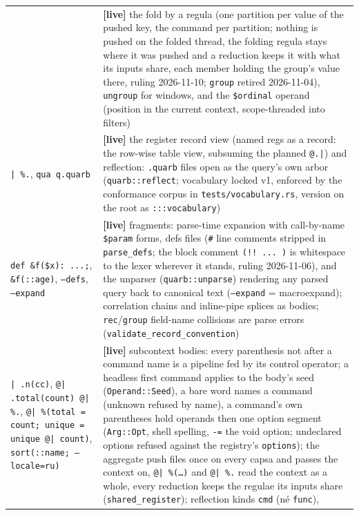 \documentclass{report}
\newcommand{\live}{\textbf{\textcolor{blue!60!black}{[live]}}\xspace}
\begin{document}
\begin{xltabular}{\textwidth}{>{\raggedright\arraybackslash}p{0.36\textwidth} X}
  & \live the fold by a regula (one partition per value of the
    pushed key, the command per partition; nothing is pushed on the
    folded thread, the folding regula stays where it was pushed and
    a reduction keeps it with what its inputs share, each member
    holding the group's value there, ruling 2026-11-10;
    \texttt{group} retired 2026-11-04),
    \texttt{ungroup} for windows, and the \texttt{\$ordinal} operand
    (position in the current context, scope-threaded into filters) \\
\texttt{| \%.}, \texttt{qua q.quarb}
  & \live the register record view (named regs as a record: the
    row-wise table view, subsuming the planned \texttt{@.|}) and
    reflection: \texttt{.quarb} files open as the query's own arbor
    (\texttt{quarb::reflect}; vocabulary locked v1, enforced by the
    conformance corpus in \texttt{tests/vocabulary.rs}, version on
    the root as \texttt{:::vocabulary}) \\
\texttt{def \&f(\$x): ...;}, \texttt{\&f(::age)},
\texttt{--defs}, \texttt{--expand}
  & \live fragments: parse-time expansion with call-by-name
    \texttt{\$param} forms, defs files (\texttt{\#} line comments
    stripped in \texttt{parse\_defs}; the block comment
    \texttt{(!!\ ...\ )} is whitespace to the lexer wherever it
    stands, ruling 2026-11-06), and the unparser
    (\texttt{quarb::unparse}) rendering any parsed query back to
    canonical text (\texttt{--expand} = macroexpand); correlation
    chains and inline-pipe splices as bodies;
    \texttt{rec}/\texttt{group} field-name collisions are parse
    errors (\texttt{validate\_record\_convention}) \\
\texttt{| .n(cc)}, \texttt{@| .total(count) @| \%.},
\texttt{@| \%(total = count; unique = unique @| count)},
\texttt{sort(::name; --locale=ru)}
  & \live subcontext bodies: every parenthesis not after a command
    name is a pipeline fed by its control operator; a headless first
    command applies to the body's seed (\texttt{Operand::Seed}), a
    bare word names a command (unknown refused by name), a command's
    own parentheses hold operands then one option segment
    (\texttt{Arg::Opt}, shell spelling, \texttt{-=} the void
    option; undeclared options refused against the registry's
    \texttt{options}); the aggregate push files once on every capsa
    and passes the context on, \texttt{@| \%(\ldots)} and
    \texttt{@| \%.} read the context as a whole, every reduction
    keeps the regulae its inputs share (\texttt{shared\_register});
    reflection kinds \texttt{cmd} (né \texttt{func}),

\end{xltabular}
\end{document}
